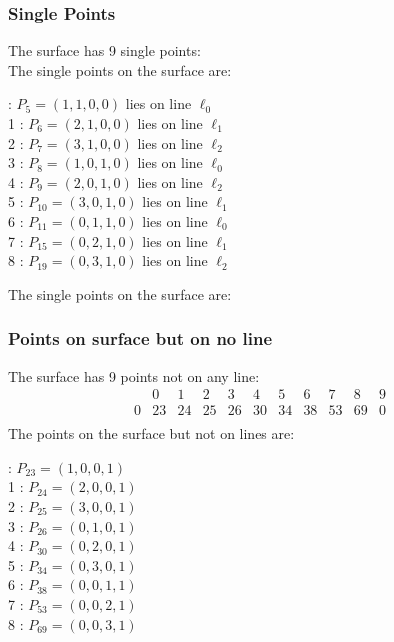 \documentclass{article}
\begin{document}
{\subsubsection*{Single Points}
The surface has 9 single points:\\
The single points on the surface are:\\
\begin{multicols}{2}
 : $P_{5}=( 1, 1, 0, 0 )$ lies on line $\ell_{0}$\\
1 : $P_{6}=( 2, 1, 0, 0 )$ lies on line $\ell_{1}$\\
2 : $P_{7}=( 3, 1, 0, 0 )$ lies on line $\ell_{2}$\\
3 : $P_{8}=( 1, 0, 1, 0 )$ lies on line $\ell_{0}$\\
4 : $P_{9}=( 2, 0, 1, 0 )$ lies on line $\ell_{2}$\\
5 : $P_{10}=( 3, 0, 1, 0 )$ lies on line $\ell_{1}$\\
6 : $P_{11}=( 0, 1, 1, 0 )$ lies on line $\ell_{0}$\\
7 : $P_{15}=( 0, 2, 1, 0 )$ lies on line $\ell_{1}$\\
8 : $P_{19}=( 0, 3, 1, 0 )$ lies on line $\ell_{2}$\\
\end{multicols}
The single points on the surface are:\\
\subsubsection*{Points on surface but on no line}
The surface has 9 points not on any line:\\
$$
\begin{array}{r|*{10}{r}}
 & 0 & 1 & 2 & 3 & 4 & 5 & 6 & 7 & 8 & 9\\
\hline
0 & 23 & 24 & 25 & 26 & 30 & 34 & 38 & 53 & 69 & 0\\
\end{array}
$$
The points on the surface but not on lines are:\\
\begin{multicols}{2}
 : $P_{23}=( 1, 0, 0, 1 )$\\
1 : $P_{24}=( 2, 0, 0, 1 )$\\
2 : $P_{25}=( 3, 0, 0, 1 )$\\
3 : $P_{26}=( 0, 1, 0, 1 )$\\
4 : $P_{30}=( 0, 2, 0, 1 )$\\
5 : $P_{34}=( 0, 3, 0, 1 )$\\
6 : $P_{38}=( 0, 0, 1, 1 )$\\
7 : $P_{53}=( 0, 0, 2, 1 )$\\
8 : $P_{69}=( 0, 0, 3, 1 )$\\
\end{multicols}
}
\end{document}
